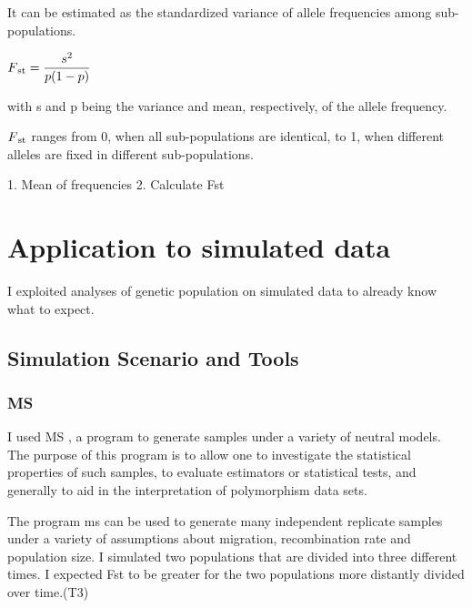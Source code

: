 It can be estimated as the standardized variance of allele frequencies among sub-populations.

$F\textsubscript{st} = \dfrac{s^{2}}{p(1-p)}$

with s and p being the variance and mean, respectively, of the allele frequency. 

$F\textsubscript{st}$ \cite{barbujani2010human} ranges from 0, when all sub-populations are identical, to 1, when different alleles are fixed in different sub-populations.

1. Mean of frequencies
2. Calculate Fst


\vspace{8cm}



\section{Application to simulated data}
I exploited analyses of genetic population on simulated data to already know what to expect.



\subsection{Simulation Scenario and Tools}

\subsubsection{MS}

I used MS \cite{hudson2004ms}, a program to generate samples under a variety of neutral models. The purpose of this program is to allow one to investigate the statistical properties of such samples, to evaluate estimators or statistical tests, and generally to aid in the interpretation of polymorphism data sets.

The program ms can be used to generate many independent replicate samples under a variety of assumptions about migration, recombination rate and population size. I simulated two populations that are divided into three different times. I expected Fst to be greater for the two populations more distantly divided over time.(T3)


